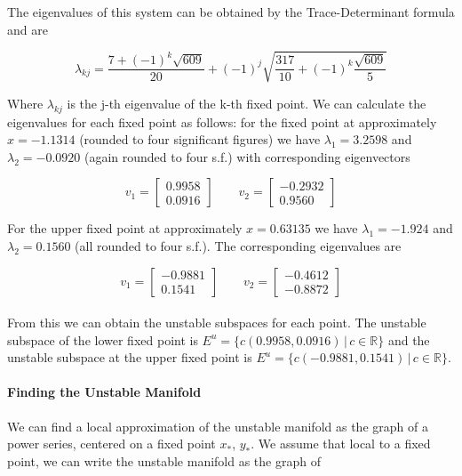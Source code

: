 \documentclass{article}
\begin{document}
The eigenvalues of this system can be obtained by the Trace-Determinant formula and are 

\begin{equation*}
	\lambda_{kj} = \frac{7 + (-1)^{k}\sqrt{609}}{20} + (-1)^j\sqrt{\frac{317}{10} + (-1)^k\frac{\sqrt{609}}{5}}
\end{equation*}

Where $\lambda_{kj}$ is the j-th eigenvalue of the k-th fixed point. We can calculate the 
eigenvalues for each fixed point as follows: for the fixed point at approximately $x = -1.1314$ 
(rounded to four significant figures) we have $\lambda_1 = 3.2598$ and $\lambda_2 = -0.0920$ 
(again rounded to four s.f.) with corresponding eigenvectors 

\begin{equation*}
	v_1 = 
	\begin{bmatrix}
		0.9958 \\ 0.0916
	\end{bmatrix}
	\qquad
	v_2 = 
	\begin{bmatrix}
		-0.2932 \\ 0.9560
	\end{bmatrix}
\end{equation*}

For the upper fixed point at approximately $x= 0.63135$ we have $\lambda_1 = -1.924$ 
and $\lambda_2 = 0.1560$ (all rounded to four s.f.). The corresponding eigenvalues are 

\begin{equation*}
	v_1 = 
	\begin{bmatrix}
		-0.9881 \\ 0.1541
	\end{bmatrix}
	\qquad 
	v_2 = 
	\begin{bmatrix}
		-0.4612 \\ -0.8872
	\end{bmatrix}
\end{equation*}

\paragraph{}
From this we can obtain the unstable subspaces for each point. The unstable subspace of the 
lower fixed point is $E^u = \{c(0.9958, 0.0916)\,|\, c \in \mathbb{R}\}$ and the unstable 
subspace at the upper fixed point is $E^u = \{c(-0.9881, 0.1541)\,|\,c \in \mathbb{R}\}$.

\paragraph{Finding the Unstable Manifold}
We can find a local approximation of the unstable manifold as the graph of a power series, 
centered on a fixed point $x_*$, $y_*$. We assume that local to a fixed point, we can write the 
unstable manifold as the graph of
\end{document}

